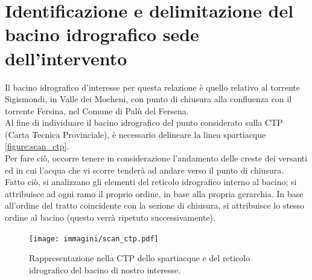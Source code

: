 \section{Identificazione e delimitazione del bacino idrografico sede dell'intervento}
Il bacino idrografico d'interesse per questa relazione è quello relativo al torrente Sigismondi, in Valle dei Mocheni, con punto di chiusura alla confluenza con il torrente Fersina, nel Comune di Palù del Fersena.\\
Al fine di individuare il bacino idrografico del punto considerato sulla CTP (Carta Tecnica Provinciale), è necessario delineare la linea spartiacque \eqref{figure:scan_ctp}.\\
Per fare ciò, occorre tenere in considerazione l'andamento delle creste dei versanti ed in cui l'acqua che vi scorre tenderà ad andare verso il punto di chiusura.\\
Fatto ciò, si analizzano gli elementi del reticolo idrografico interno al bacino; si attribuisce ad ogni ramo il proprio ordine, in base alla propria gerarchia. In base all'ordine del tratto coincidente con la sezione di chiusura, si attribuisce lo stesso ordine al bacino (questo verrà ripetuto successivamente).
\begin{figure}[hbt]\centering
    \texttt{[image: immagini/scan\_ctp.pdf]}
    \caption{Rappresentazione nella CTP dello spartiacque e del reticolo idrografico del bacino di nostro interesse.}
  \label{figure:scan_ctp}
\end{figure}

